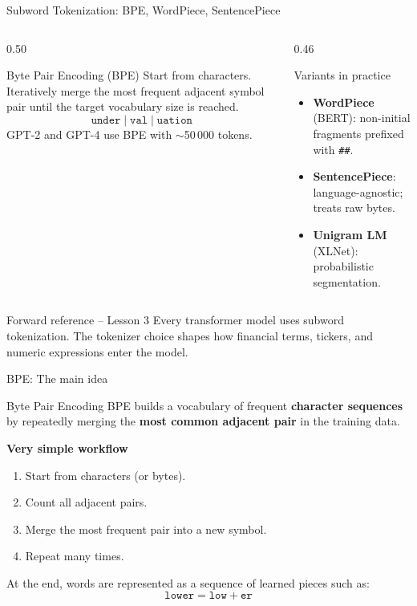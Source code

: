 \documentclass[aspectratio=169]{beamer}
\begin{document}
\begin{frame}{Subword Tokenization: BPE, WordPiece, SentencePiece}
\begin{columns}[T]
\begin{column}{0.50\textwidth}
\begin{block}{Byte Pair Encoding (BPE)}
Start from characters. Iteratively merge the most frequent adjacent symbol pair
until the target vocabulary size is reached.
\[
\texttt{under} \;|\; \texttt{val} \;|\; \texttt{uation}
\]
GPT-2 and GPT-4 use BPE with $\sim$50\,000 tokens.
\end{block}
\end{column}
\begin{column}{0.46\textwidth}
\begin{block}{Variants in practice}
\begin{itemize}
    \item \textbf{WordPiece} (BERT): non-initial fragments prefixed with \texttt{\#\#}.
    \item \textbf{SentencePiece}: language-agnostic; treats raw bytes.
    \item \textbf{Unigram LM} (XLNet): probabilistic segmentation.
\end{itemize}
\end{block}
\end{column}
\end{columns}
 
\vspace{0.15cm}
\begin{alertblock}{Forward reference -- Lesson 3}
Every transformer model uses subword tokenization. The tokenizer choice shapes
how financial terms, tickers, and numeric expressions enter the model.
\end{alertblock}
\end{frame}
%
%
\begin{frame}{BPE: The main idea}
\begin{block}{Byte Pair Encoding}
BPE builds a vocabulary of frequent \textbf{character sequences} by repeatedly merging the \textbf{most common adjacent pair} in the training data.
\end{block}

\vspace{0.3cm}
\textbf{Very simple workflow}
\begin{enumerate}
  \item Start from characters (or bytes).
  \item Count all adjacent pairs.
  \item Merge the most frequent pair into a new symbol.
  \item Repeat many times.
\end{enumerate}

\vspace{0.3cm}
At the end, words are represented as a sequence of learned pieces such as:
\[
\texttt{lower} = \texttt{low} + \texttt{er}
\]
\end{frame}
\end{document}
